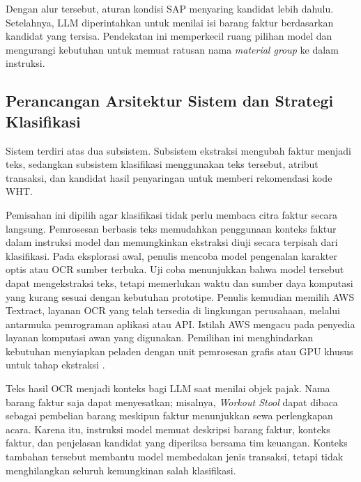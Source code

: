 Dengan alur tersebut, aturan kondisi SAP menyaring kandidat lebih dahulu. Setelahnya, LLM diperintahkan untuk menilai isi barang faktur berdasarkan kandidat yang tersisa. Pendekatan ini memperkecil ruang pilihan model dan mengurangi kebutuhan untuk memuat ratusan nama \textit{material group} ke dalam instruksi.

\subsection{Perancangan Arsitektur Sistem dan Strategi Klasifikasi}
\label{subsec:perancangan_arsitektur_strategi_klasifikasi}

Sistem terdiri atas dua subsistem. Subsistem ekstraksi mengubah faktur menjadi teks, sedangkan subsistem klasifikasi menggunakan teks tersebut, atribut transaksi, dan kandidat hasil penyaringan untuk memberi rekomendasi kode WHT.

Pemisahan ini dipilih agar klasifikasi tidak perlu membaca citra faktur secara langsung. Pemrosesan berbasis teks memudahkan penggunaan konteks faktur dalam instruksi model dan memungkinkan ekstraksi diuji secara terpisah dari klasifikasi. Pada eksplorasi awal, penulis mencoba model pengenalan karakter optis atau \label{abbr:OCR}OCR sumber terbuka. Uji coba menunjukkan bahwa model tersebut dapat mengekstraksi teks, tetapi memerlukan waktu dan sumber daya komputasi yang kurang sesuai dengan kebutuhan prototipe. Penulis kemudian memilih AWS Textract, layanan OCR yang telah tersedia di lingkungan perusahaan, melalui antarmuka pemrograman aplikasi atau \label{abbr:API}API. Istilah \label{abbr:AWS}AWS mengacu pada penyedia layanan komputasi awan yang digunakan. Pemilihan ini menghindarkan kebutuhan menyiapkan peladen dengan unit pemrosesan grafis atau \label{abbr:GPU}GPU khusus untuk tahap ekstraksi \parencite{awsTextractAsync}.

Teks hasil OCR menjadi konteks bagi LLM saat menilai objek pajak. Nama barang faktur saja dapat menyesatkan; misalnya, \textit{Workout Stool} dapat dibaca sebagai pembelian barang meskipun faktur menunjukkan sewa perlengkapan acara. Karena itu, instruksi model memuat deskripsi barang faktur, konteks faktur, dan penjelasan kandidat yang diperiksa bersama tim keuangan. Konteks tambahan tersebut membantu model membedakan jenis transaksi, tetapi tidak menghilangkan seluruh kemungkinan salah klasifikasi.


